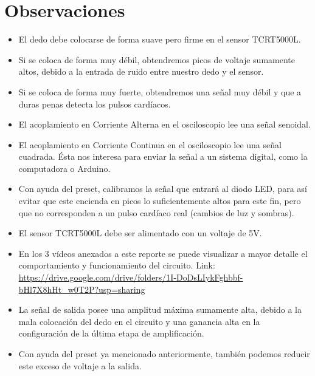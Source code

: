 \documentclass[12pt]{article}
\begin{document}
	\section{Observaciones}
	\begin{itemize}
            \item[\checkmark] El dedo debe colocarse de forma suave pero firme en el sensor TCRT5000L. 
            \item[\checkmark] Si se coloca de forma muy débil, obtendremos picos de voltaje sumamente altos, debido a la entrada de ruido entre nuestro dedo y el sensor.
            \item[\checkmark] Si se coloca de forma muy fuerte, obtendremos una señal muy débil y que a duras penas detecta los pulsos cardíacos.
            \item[\checkmark] El acoplamiento en Corriente Alterna en el osciloscopio lee una señal senoidal.
            \item[\checkmark] El acoplamiento en Corriente Continua en el osciloscopio lee una señal cuadrada. Ésta nos interesa para enviar la señal a un sistema digital, como la computadora o Arduino.
            \item[\checkmark] Con ayuda del preset, calibramos la señal que entrará al diodo LED, para así evitar que este encienda en picos lo suficientemente altos para este fin, pero que no corresponden a un pulso cardíaco real (cambios de luz y sombras).
            \item[\checkmark] El sensor TCRT5000L debe ser alimentado con un voltaje de 5V.
            \item[\checkmark] En los 3 vídeos anexados a este reporte se puede visualizar a mayor detalle el \\ comportamiento y funcionamiento del circuito. Link: \url{https://drive.google.com/drive/folders/1I-DoDsLIykFghbbf-bHl7X8hHt_w0T2P?usp=sharing}
            \item[\checkmark] La señal de salida posee una amplitud máxima sumamente alta, debido a la mala colocación del dedo en el circuito y una ganancia alta en la configuración de la última etapa de amplificación.
            \item[\checkmark] Con ayuda del preset ya mencionado anteriormente, también podemos reducir este exceso de voltaje a la salida.
    \end{itemize}
            
    

\end{document}
